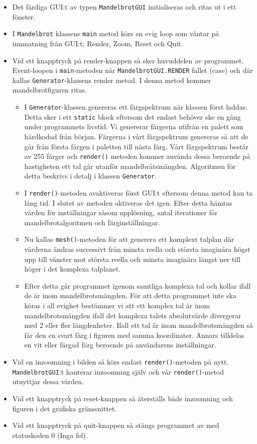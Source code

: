 \documentclass[a4paper]{article}
\newcommand{\code}[1]{\texttt{#1}} %
\begin{document}
\begin{itemize}
\item Det färdiga GUI:t av typen \code{MandelbrotGUI} initialiseras och ritas ut i ett fönster.
\item I \code{Mandelbrot} klassens \code{main} metod körs en evig loop som väntar på innmatning från GUI:t; Render, Zoom, Reset och Quit.
\item Vid ett knapptryck på render-knappen så sker huvuddelen av programmet. Event-loopen i \code{main}-metoden når \code{MandelbrotGUI.RENDER} fallet (case) och där kallas \code{Generator}-klassens render metod. I denna metod kommer mandelbrotfiguren ritas.
\begin{itemize}
	\item I \code{Generator}-klassen genereras ett färgspektrum när klassen först laddas. Detta sker i ett \code{static} block eftersom det endast behöver ske en gång under programmets livstid. Vi genererar färgerna utifrån en palett som hårdkodad från början. \newline
	Färgerna i vårt färgspektrum genereras så att de går från första färgen i paletten till nästa färg. Vårt färgspektrum består av 255 färger och \code{render()} metoden kommer använda dessa beroende på hastigheten ett tal går utanför mandelbråtsmängden. Algoritmen för detta beskrivs i detalj i klassen \code{Generator}.
	\item I \code{render()}-metoden avaktiveras först GUI:t eftersom denna metod kan ta lång tid. I slutet av metoden aktiveras det igen. Efter detta hämtas värden för inställningar såsom upplösning, antal iterationer för mandelbrotalgoritmen och färginställningar.
	\item Nu kallas \code{mesh()}-metoden för att generera ett komplext talplan där värderna ändras successivt från minsta reella och största imaginära högst upp till vänster mot största reella och minsta imaginära längst ner till höger i det komplexa talplanet.
	\item Efter detta går programmet igenom samtliga komplexa tal och kollar ifall de är inom mandelbrotsmängden. För att detta programmet inte ska köras i all evighet bestämmer vi att ett komplex tal är inom mandelbrotsmängden ifall det komplexa talets absolutvärde divergerar med 2 eller fler längdenheter. Ifall ett tal är inom mandelbrotsmängden så får den en svart färg i figuren med samma koordinater. Annars tilldelas en vit eller färgad färg beroende på användarens inställningar.
\end{itemize}
\item Vid en inzoomning i bilden så körs endast \code{render()}-metoden på nytt. \code{MandelbrotGUI}:t hanterar inzoomning själv och vår \code{render()}-metod utnyttjar dessa värden.
\item Vid ett knapptryck på reset-knappen så återställs både inzoomning och figuren i det grafiska gränssnittet.
\item Vid ett knapptryck på quit-knappen så stängs programmet av med statuskoden 0 (Inga fel).
\end{itemize}
\end{document}

